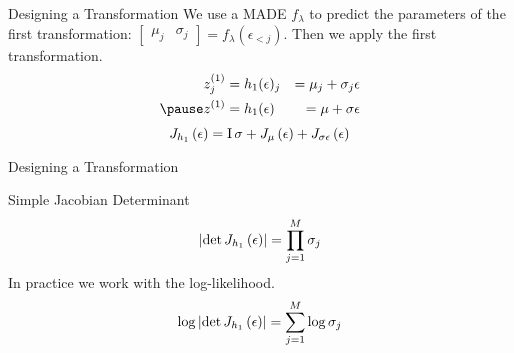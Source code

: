 \documentclass[14pt]{beamer}
\begin{document}
\begin{frame}{Designing a Transformation}
We use a MADE $ f_{\lambda} $ to predict the parameters of the first transformation: $ \begin{bmatrix} \mu_{j} & \sigma_{j} \end{bmatrix} =  f_{\lambda}(\epsilon_{<j}) $.
Then we apply the first transformation.
\begin{equation*}
\begin{aligned}
z^{(1)}_{j} &= h_{1}(\epsilon)_{j} &= \mu_{j} + \sigma_{j} \epsilon \\ \pause
z^{(1)} &= h_{1}(\epsilon) &= \mu + \sigma \epsilon
\end{aligned}
\end{equation*}
\pause
\begin{equation*}
J_{h_{1}}\left(\epsilon\right) = \operatorname{I} \sigma + J_{\mu}\left(\epsilon\right) +J_{\sigma \epsilon}\left(\epsilon\right)
\end{equation*}
\end{frame}

\begin{frame}{Designing a Transformation}
\begin{block}{Simple Jacobian Determinant}
\begin{equation*}
\left|\det J_{h_{1}}\left(\epsilon\right)\right| = \prod_{j=1}^{M}\sigma_{j}
\end{equation*}
In practice we work with the log-likelihood.
\begin{equation*}
\log\left|\det J_{h_{1}}\left(\epsilon\right)\right| = \sum_{j=1}^{M}\log\sigma_{j}
\end{equation*}
\end{block}
\end{frame}
\end{document}
